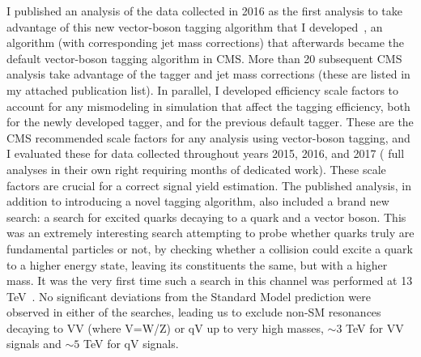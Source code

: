 \documentclass{pasa}%
\begin{document}
I published an analysis of the data collected in 2016 as the first analysis to take advantage of this new vector-boson tagging algorithm that I developed~\cite{CMS-PAS-B2G-16-021,Sirunyan:2017acf}, an algorithm (with corresponding jet mass corrections) that afterwards became the default vector-boson tagging algorithm in CMS. More than 20 subsequent CMS analysis take advantage of the tagger and jet mass corrections (these are listed in my attached publication list). In parallel, I developed efficiency scale factors to account for any mismodeling in simulation that affect the tagging efficiency, both for the newly developed tagger, and for the previous default tagger. These are the CMS recommended scale factors for any analysis using vector-boson tagging, and I evaluated these for data collected throughout years 2015, 2016, and 2017 ( full analyses in their own right requiring months of dedicated work). These scale factors are crucial for a correct signal yield estimation. The published analysis, in addition to introducing a novel tagging algorithm, also included a brand new search: a search for excited quarks decaying to a quark and a vector boson. This was an extremely interesting search attempting to probe whether quarks truly are fundamental particles or not, by checking whether a collision could excite a quark to a higher energy state, leaving its constituents the same, but with a higher mass. It was the very first time such a search in this channel was performed at 13 TeV~\cite{CMS-PAS-B2G-16-021}. No significant deviations from the  Standard Model prediction were observed in either of the searches, leading us to exclude non-SM resonances decaying to VV (where V=W/Z) or qV up to very high masses, $\sim3$ TeV for VV signals and $\sim5$ TeV for qV signals.
\end{document}
